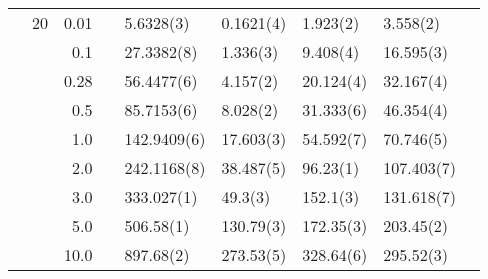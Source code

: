 \begin{table}[H]
\begin{tabularx}{\textwidth}{R{1cm}rrcR{2.3cm}R{2.3cm}R{2.3cm}R{2.3cm}R{1cm}}
		&20 & 0.01 && 5.6328(3) & 0.1621(4) & 1.923(2) & 3.558(2) \\
		&& 0.1 && 27.3382(8) & 1.336(3) & 9.408(4) & 16.595(3) \\
		&& 0.28 && 56.4477(6) & 4.157(2) & 20.124(4) & 32.167(4) \\
		&& 0.5 && 85.7153(6) & 8.028(2) & 31.333(6) & 46.354(4) \\
		&& 1.0 && 142.9409(6) & 17.603(3) & 54.592(7) & 70.746(5) \\
		&& 2.0 && 242.1168(8) & 38.487(5) & 96.23(1) & 107.403(7) \\
		&& 3.0 && 333.027(1) & 49.3(3) & 152.1(3) & 131.618(7) \\ 
		&& 5.0 && 506.58(1) & 130.79(3) & 172.35(3) & 203.45(2) \\
		&& 10.0 && 897.68(2) & 273.53(5) & 328.64(6) & 295.52(3) \\
		\hline \hline
	\end{tabularx}
\end{table}

